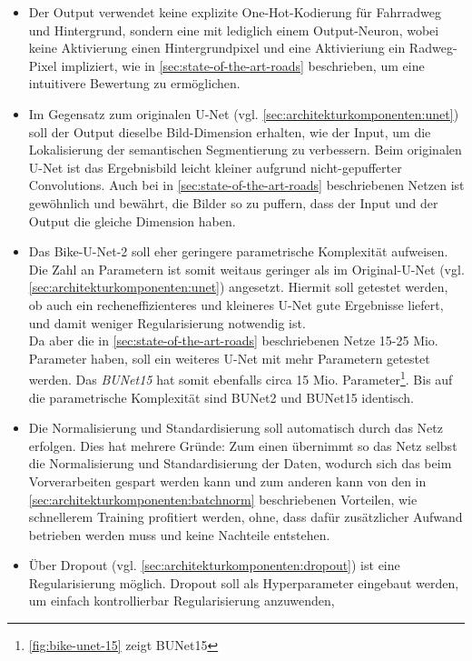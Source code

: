 \begin{itemize}
	\item Der Output verwendet keine explizite One-Hot-Kodierung für Fahrradweg und Hintergrund, 
	sondern eine mit lediglich einem Output-Neuron, wobei keine Aktivierung einen Hintergrundpixel 
	und eine Aktivieriung ein Radweg-Pixel impliziert, wie in \autoref{sec:state-of-the-art-roads} beschrieben, 
	um eine intuitivere Bewertung zu ermöglichen. 
	\item Im Gegensatz zum originalen U-Net (vgl. \autoref{sec:architekturkomponenten:unet}) soll der 
	Output dieselbe Bild-Dimension erhalten, wie der Input, um die Lokalisierung der semantischen Segmentierung zu verbessern.
	Beim originalen U-Net ist das Ergebnisbild leicht kleiner aufgrund nicht-gepufferter Convolutions.
	Auch bei in \autoref{sec:state-of-the-art-roads} beschriebenen Netzen ist gewöhnlich und bewährt, 
	die Bilder so zu puffern, dass der Input und der Output die gleiche Dimension haben.
	\item 
	Das Bike-U-Net-2 soll eher geringere parametrische Komplexität aufweisen. 
	Die Zahl an Parametern ist somit weitaus geringer als im Original-U-Net (vgl. \autoref{sec:architekturkomponenten:unet}) angesetzt. 
	Hiermit soll getestet werden, ob auch ein recheneffizienteres und kleineres U-Net gute Ergebnisse liefert, 
	und damit weniger Regularisierung notwendig ist. \\
	Da aber die in \autoref{sec:state-of-the-art-roads} beschriebenen Netze 15-25 Mio. Parameter haben, 
	soll ein weiteres U-Net mit mehr Parametern getestet werden. Das \textit{\ac{BUNet15}} hat somit ebenfalls circa 15 Mio. 
	Parameter\footnote{\autoref{fig:bike-unet-15} zeigt \ac{BUNet15}}.
	Bis auf die parametrische Komplexität sind \ac{BUNet2} und \ac{BUNet15} identisch.
	\item Die Normalisierung und Standardisierung soll automatisch durch das Netz erfolgen. 
	Dies hat mehrere Gründe: Zum einen übernimmt so das Netz selbst die Normalisierung und Standardisierung der Daten, 
	wodurch sich das beim Vorverarbeiten gespart werden kann und zum anderen kann von den in \autoref{sec:architekturkomponenten:batchnorm} 
	beschriebenen Vorteilen, wie schnellerem Training profitiert werden, 
	ohne, dass dafür zusätzlicher Aufwand betrieben werden muss und keine Nachteile entstehen.
	\item Über Dropout (vgl. \autoref{sec:architekturkomponenten:dropout}) ist eine Regularisierung möglich. Dropout soll als 
    Hyperparameter eingebaut werden, um einfach kontrollierbar Regularisierung anzuwenden, 

\end{itemize}

